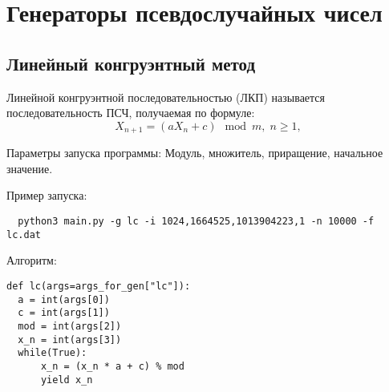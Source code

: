 \documentclass[spec, och, labwork]{shiza}
\begin{document}
\tableofcontents

\section{Генераторы псевдослучайных чисел}
\subsection{Линейный конгруэнтный метод}
Линейной конгруэнтной последовательностью (ЛКП) называется последовательность ПСЧ, получаемая по формуле:
\begin{equation}
  X_{n + 1} = (aX_n + c) \mod m, \; n \geq 1,
\end{equation}

Параметры запуска программы:
Модуль, множитель, приращение, начальное значение.

Пример запуска:
\begin{small}
\begin{verbatim}
  python3 main.py -g lc -i 1024,1664525,1013904223,1 -n 10000 -f lc.dat
\end{verbatim}
\end{small}

Алгоритм:
\begin{small}
\begin{verbatim}
def lc(args=args_for_gen["lc"]):
  a = int(args[0])
  c = int(args[1])
  mod = int(args[2])
  x_n = int(args[3]) 
  while(True):
      x_n = (x_n * a + c) % mod
      yield x_n
\end{verbatim}
\end{small}


\end{document}
